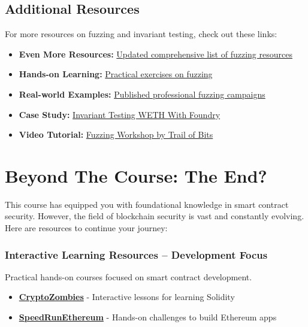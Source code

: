 \documentclass[12pt]{article}
\begin{document}
\subsection*{Additional Resources}
\medskip
\noindent
For more resources on fuzzing and invariant testing, check out these links:
\begin{itemize}
    \item \textbf{Even More Resources:} \href{https://github.com/perimetersec/evm-fuzzing-resources?tab=readme-ov-file#evm-fuzzing-resources}{Updated comprehensive list of fuzzing resources}
    \item \textbf{Hands-on Learning:} \href{https://github.com/crytic/building-secure-contracts/tree/master/program-analysis/echidna/exercises}{Practical exercises on fuzzing}
    \item \textbf{Real-world Examples:} \href{https://github.com/perimetersec/public-fuzzing-campaigns-list}{Published professional fuzzing campaigns}
    \item \textbf{Case Study:} \href{https://mirror.xyz/horsefacts.eth/Jex2YVaO65dda6zEyfM_-DXlXhOWCAoSpOx5PLocYgw}{Invariant Testing WETH With Foundry}
    \item \textbf{Video Tutorial:} \href{https://www.youtube.com/playlist?list=PLciHOL_J7Iwqdja9UH4ZzE8dP1IxtsBXI}{Fuzzing Workshop by Trail of Bits}
\end{itemize}

\section{Beyond The Course: The End?}

This course has equipped you with foundational knowledge in smart contract
security. However, the field of blockchain security is vast and constantly
evolving. Here are resources to continue your journey:

\subsubsection*{Interactive Learning Resources -- Development Focus}

Practical hands-on courses focused on smart contract development.

\begin{itemize}
    \item \textbf{\href{https://cryptozombies.io/}{CryptoZombies}} - Interactive lessons for learning Solidity
    \item \textbf{\href{https://speedrunethereum.com/}{SpeedRunEthereum}} - Hands-on challenges to build Ethereum apps
\end{itemize}
\end{document}
